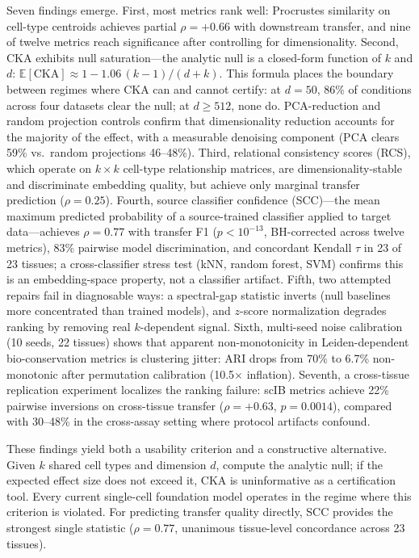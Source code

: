\documentclass[11pt]{article}
\begin{document}
Seven findings emerge. First, most metrics rank well: Procrustes
similarity on cell-type centroids achieves partial $\rho = +0.66$ with
downstream transfer, and nine of twelve metrics reach significance after
controlling for dimensionality. Second, CKA exhibits null saturation---the
analytic null is a closed-form function of $k$ and $d$:
$\mathbb{E}[\mathrm{CKA}] \approx 1 - 1.06\,(k{-}1)/(d{+}k)$. This
formula places the boundary between regimes where CKA can and cannot
certify: at $d = 50$, 86\% of conditions across four datasets clear the
null; at $d \geq 512$, none do. PCA-reduction and random projection
controls confirm that dimensionality reduction accounts for the majority
of the effect, with a measurable denoising component (PCA clears 59\%
vs.\ random projections 46--48\%). Third, relational consistency scores
(RCS), which operate on $k \times k$ cell-type relationship matrices,
are dimensionality-stable and discriminate embedding quality, but
achieve only marginal transfer prediction ($\rho = 0.25$). Fourth,
source classifier confidence (SCC)---the mean maximum predicted
probability of a source-trained classifier applied to target
data---achieves $\rho = 0.77$ with transfer F1 ($p < 10^{-13}$,
BH-corrected across twelve metrics), 83\% pairwise model discrimination,
and concordant Kendall $\tau$ in 23 of 23 tissues; a cross-classifier
stress test (kNN, random forest, SVM) confirms this is an
embedding-space property, not a classifier artifact. Fifth, two attempted
repairs fail in diagnosable ways: a spectral-gap statistic inverts
(null baselines more concentrated than trained models),
and $z$-score normalization degrades ranking by removing real
$k$-dependent signal. Sixth, multi-seed noise calibration (10 seeds, 22
tissues) shows that apparent non-monotonicity in Leiden-dependent
bio-conservation metrics is clustering jitter: ARI drops from 70\% to
6.7\% non-monotonic after permutation calibration (10.5$\times$
inflation). Seventh, a cross-tissue replication experiment localizes the
ranking failure: scIB metrics achieve 22\% pairwise inversions on
cross-tissue transfer ($\rho = +0.63$, $p = 0.0014$), compared with
30--48\% in the cross-assay setting where protocol artifacts confound.

These findings yield both a usability criterion and a constructive
alternative. Given $k$ shared cell types and dimension $d$, compute the
analytic null; if the expected effect size does not exceed it, CKA is
uninformative as a certification tool. Every current single-cell
foundation model operates in the regime where this criterion is
violated. For predicting transfer quality directly, SCC provides the
strongest single statistic ($\rho = 0.77$, unanimous tissue-level
concordance across 23 tissues).
\end{document}
